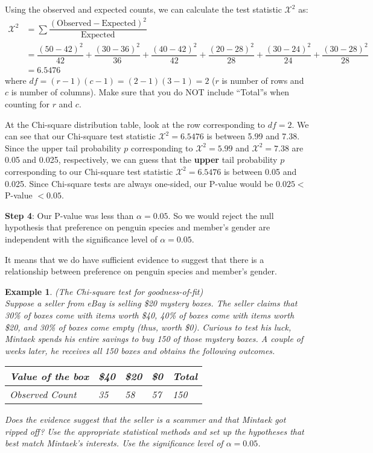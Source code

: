 \documentclass[12pt]{article}
\newcounter{lecnum}
\newtheorem{example}{Example}[lecnum]
\begin{document}
Using the observed and expected counts, we can calculate the test statistic $\mathcal{X}^2$ as:
\begin{align*}
	\mathcal{X}^2 &= \sum \dfrac{(\text{Observed} - \text{Expected})^2}{\text{Expected}} \\
	&= \dfrac{(50-42)^2}{42} + \dfrac{(30-36)^2}{36} + \dfrac{(40-42)^2}{42} + \dfrac{(20-28)^2}{28} + \dfrac{(30-24)^2}{24} + \dfrac{(30-28)^2}{28} \\
	&= 6.5476
\end{align*}
where $df = (r-1)(c-1) = (2-1)(3-1) = 2$ ($r$ is number of rows and $c$ is number of columns). Make sure that you do NOT include ``Total''s when counting for $r$ and $c$.

At the Chi-square distribution table, look at the row corresponding to $df = 2$. We can see that our Chi-square test statistic $\mathcal{X}^2 = 6.5476$ is between 5.99 and 7.38. Since the upper tail probability $p$ corresponding to $\mathcal{X}^2 = 5.99$ and $\mathcal{X}^2 = 7.38$ are 0.05 and 0.025, respectively, we can guess that the \textbf{upper} tail probability $p$ corresponding to our Chi-square test statistic $\mathcal{X}^2 = 6.5476$ is between 0.05 and 0.025. Since Chi-square tests are always one-sided, our P-value would be $0.025 <$ P-value $< 0.05$.

\noindent \textbf{Step 4}: Our P-value was less than $\alpha = 0.05$. So we would reject the null hypothesis that preference on penguin species and member's gender are independent with the significance level of $\alpha = 0.05$.

It means that we do have sufficient evidence to suggest that there is a relationship between preference on penguin species and member's gender.

\pagebreak

\begin{example} (\textit{The Chi-square test for goodness-of-fit}) \\
	Suppose a seller from eBay is selling \$20 mystery boxes. The seller claims that 30\% of boxes come with items worth \$40, 40\% of boxes come with items worth \$20, and 30\% of boxes come empty (thus, worth \$0). Curious to test his luck, Mintaek spends his entire savings to buy 150 of those mystery boxes. A couple of weeks later, he receives all 150 boxes and obtains the following outcomes.
	\begin{table}[h]
		\centering
		\begin{tabular}{l|lll|l}
			Value of the box & \$40 & \$20 & \$0 & Total \\ \hline
			Observed Count & 35 & 58 & 57 & 150
		\end{tabular}
	\end{table}
	\vspace{-10pt}

	Does the evidence suggest that the seller is a scammer and that Mintaek got ripped off? Use the appropriate statistical methods and set up the hypotheses that best match Mintaek's interests. Use the significance level of $\alpha = 0.05$.
\end{example}
\end{document}
